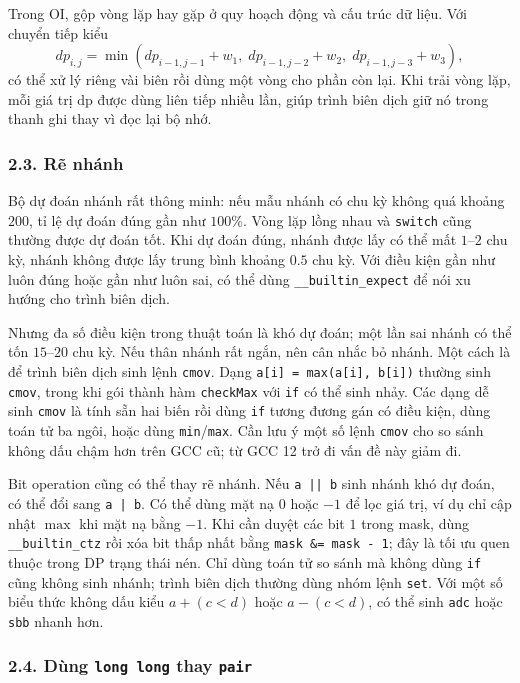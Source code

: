 \documentclass[11pt]{article}
\begin{document}
Trong OI, gộp vòng lặp hay gặp ở quy hoạch động và cấu trúc dữ liệu. Với chuyển
tiếp kiểu
\[
dp_{i,j}=\min(dp_{i-1,j-1}+w_1,\;dp_{i-1,j-2}+w_2,\;dp_{i-1,j-3}+w_3),
\]
có thể xử lý riêng vài biên rồi dùng một vòng cho phần còn lại. Khi trải vòng
lặp, mỗi giá trị \(\mathrm{dp}\) được dùng liên tiếp nhiều lần, giúp trình biên
dịch giữ nó trong thanh ghi thay vì đọc lại bộ nhớ.

\subsubsection*{2.3. Rẽ nhánh}

Bộ dự đoán nhánh rất thông minh: nếu mẫu nhánh có chu kỳ không quá khoảng
\(200\), tỉ lệ dự đoán đúng gần như \(100\%\). Vòng lặp lồng nhau và
\texttt{switch} cũng thường được dự đoán tốt. Khi dự đoán đúng, nhánh được lấy
có thể mất \(1\)--\(2\) chu kỳ, nhánh không được lấy trung bình khoảng
\(0.5\) chu kỳ. Với điều kiện gần như luôn đúng hoặc gần như luôn sai, có thể
dùng \texttt{\_\_builtin\_expect} để nói xu hướng cho trình biên dịch.

Nhưng đa số điều kiện trong thuật toán là khó dự đoán; một lần sai nhánh có thể
tốn \(15\)--\(20\) chu kỳ. Nếu thân nhánh rất ngắn, nên cân nhắc bỏ nhánh. Một
cách là để trình biên dịch sinh lệnh \texttt{cmov}. Dạng
\texttt{a[i] = max(a[i], b[i])} thường sinh \texttt{cmov}, trong khi gói thành
hàm \texttt{checkMax} với \texttt{if} có thể sinh nhảy. Các dạng dễ sinh
\texttt{cmov} là tính sẵn hai biến rồi dùng \texttt{if} tương đương gán có điều
kiện, dùng toán tử ba ngôi, hoặc dùng \texttt{min}/\texttt{max}. Cần lưu ý một
số lệnh \texttt{cmov} cho so sánh không dấu chậm hơn trên GCC cũ; từ GCC 12 trở
đi vấn đề này giảm đi.

Bit operation cũng có thể thay rẽ nhánh. Nếu \texttt{a || b} sinh nhánh khó
dự đoán, có thể đổi sang \texttt{a | b}. Có thể dùng mặt nạ \(0\) hoặc \(-1\)
để lọc giá trị, ví dụ chỉ cập nhật \(\max\) khi mặt nạ bằng \(-1\). Khi cần
duyệt các bit \(1\) trong mask, dùng \texttt{\_\_builtin\_ctz} rồi xóa bit thấp
nhất bằng \texttt{mask \&= mask - 1}; đây là tối ưu quen thuộc trong DP trạng
thái nén. Chỉ dùng toán tử so sánh mà không dùng \texttt{if} cũng không sinh
nhánh; trình biên dịch thường dùng nhóm lệnh \texttt{set}. Với một số biểu thức
không dấu kiểu \(a+(c<d)\) hoặc \(a-(c<d)\), có thể sinh \texttt{adc} hoặc
\texttt{sbb} nhanh hơn.

\subsubsection*{2.4. Dùng \texttt{long long} thay \texttt{pair}}
\end{document}
